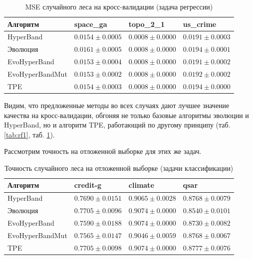 \documentclass[a4paper,12pt]{article}
\begin{document}
\begin{table}[h]
\centering
\begin{tabular}{|l|l|l|l|}
\hline
Алгоритм               & space\_ga                     & topo\_2\_1            & us\_crime                     \\ \hline
HyperBand              & $0.0154 \pm 0.0005$          & $0.0008 \pm 0.0000$ & $0.0191 \pm 0.0003$          \\ \hline
Эволюция               & $0.0161 \pm 0.0005$          & $0.0008 \pm 0.0000$ & $0.0194 \pm 0.0001$          \\ \hline
EvoHyperBand           & $\mathbf{0.0153 \pm 0.0004}$ & $0.0008 \pm 0.0000$ & $\mathbf{0.0191 \pm 0.0002}$ \\ \hline
EvoHyperBandMut & $\mathbf{0.0153 \pm 0.0002}$ & $0.0008 \pm 0.0000$ & $0.0192 \pm 0.0002$          \\ \hline
TPE                    & $0.0154 \pm 0.0003$          & $0.0008 \pm 0.0000$ & $0.0194 \pm 0.0000$          \\ \hline
\end{tabular}
\caption{MSE случайного леса на кросс-валидации (задача регрессии)}
\label{tab:rf_regr}
\end{table}

Видим, что предложенные методы во всех случаях дают лучшее значение качества на кросс-валидации, обгоняя не только базовые алгоритмы эволюции и HyperBand, но и алгоритм TPE, работающий по другому принципу (таб. \ref{tab:rf1}, таб. \ref{tab:rf_regr}).

\newpage

Рассмотрим точность на отложенной выборке для этих же задач.

\begin{table}[h]
\centering
\begin{tabular}{|l|l|l|l|}
\hline
Алгоритм               & credit-g                     & climate                      & qsar                         \\ \hline
HyperBand              & $0.7690 \pm 0.0151$          & $0.9065 \pm 0.0028$          & $0.8768 \pm 0.0079$          \\ \hline
Эволюция               & $\mathbf{0.7705 \pm 0.0096}$ & $\mathbf{0.9074 \pm 0.0000}$ & $0.8540 \pm 0.0101$          \\ \hline
EvoHyperBand           & $0.7590 \pm 0.0188$ & $\mathbf{0.9074 \pm 0.0000}$ & $0.8730 \pm 0.0082$          \\ \hline
EvoHyperBandMut & $0.7565 \pm 0.0147$          & $0.9046 \pm 0.0059$ & $\mathbf{0.8768 \pm 0.0067}$ \\ \hline
TPE                    & $\mathbf{0.7705 \pm 0.0098}$ & $\mathbf{0.9074 \pm 0.0000}$ & $\mathbf{0.8777 \pm 0.0076}$ \\ \hline
\end{tabular}
\caption{Точность случайного леса на отложенной выборке (задачи классификации)}
\label{tab:rf2}
\end{table}
\par
\end{document}
